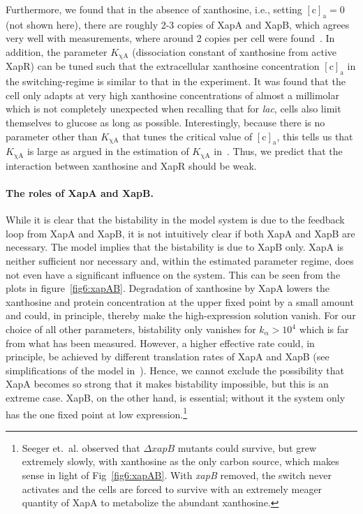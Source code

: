 \documentclass[10pt,letterpaper]{article}
\newcommand{\n}[1]{\mathrm{#1}}
\begin{document}
	Furthermore, we found that in the absence of xanthosine, i.e., setting
	$\n{[c]_a}=0$ (not shown here), there are roughly 2-3 copies of XapA and XapB, which agrees very
	well with measurements, where around 2 copies per cell were
	found~\cite{Li2014}. In addition, the parameter $K_{\n{\chi A}}$
	(dissociation constant of xanthosine from active XapR) can be tuned such
	that the extracellular xanthosine concentration $\n{[c]_a}$ in the
	switching-regime is similar to that in the experiment. It was found that the
	cell only adapts at very high xanthosine concentrations of almost a
	millimolar~\cite{Norholm2001} which is not completely unexpected when
	recalling that for \emph{lac}, cells also limit themselves to glucose as
	long as possible. Interestingly, because there is no parameter other than
	$K_{\n{\chi A}}$ that tunes the critical value of $\n{[c]_a}$, this tells us
	that $K_{\n{\chi A}}$ is large as argued in the estimation of $K_{\n{\chi
			A}}$ in~. Thus, we predict that the interaction between xanthosine and XapR
	should be weak.
	
	\paragraph*{The roles of XapA and XapB.}
	While it is clear that the bistability in the model system is due to the
	feedback loop from XapA and XapB, it is not intuitively clear if both XapA and XapB
	are necessary. The model implies that the bistability is due to XapB only. XapA
	is neither sufficient nor necessary and, within the estimated parameter
	regime, does not even have a significant influence on the system. This can
	be seen from the plots in figure~\ref{fig6:xapAB}.
	Degradation of xanthosine by XapA lowers the xanthosine and protein concentration at the upper
	fixed point by a small amount and could, in principle, thereby make the
	high-expression solution vanish. For our choice of all other parameters,
	bistability only vanishes for $k_{\n{\alpha}} > 10^4$ which is far from what has been
	measured. However, a higher effective rate could, in principle, be achieved by
	different translation rates of XapA and XapB (see simplifications of the
	model in~). Hence, we cannot exclude the possibility that
	XapA becomes so strong that it makes bistability impossible, but this is an
	extreme case. XapB, on the other hand, is essential; without it the system
	only has the one fixed point at low expression.\footnote{
		Seeger et.\ al.\cite{Seeger1995} observed that $\Delta xapB$ mutants could
		survive, but grew extremely slowly, with xanthosine as the only carbon
		source, which makes sense in light of Fig~\ref{fig6:xapAB}.
		With \textit{xapB} removed, the switch never activates and the cells are
		forced to survive with an extremely meager quantity of XapA to metabolize
		the abundant xanthosine.}
	
\end{document}
